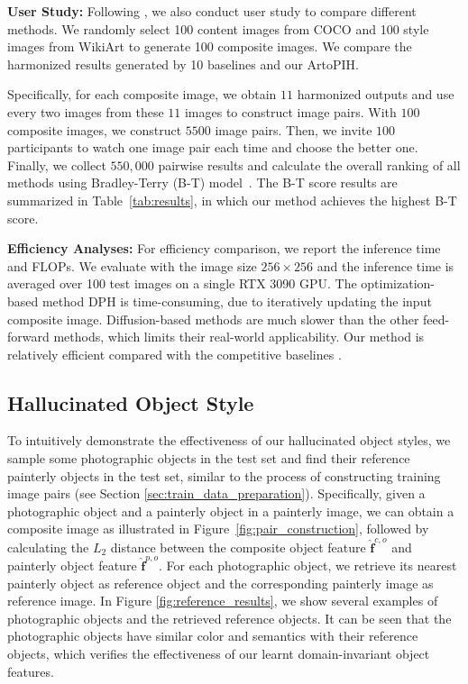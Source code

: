 \documentclass[letterpaper]{article} %
\begin{document}
\textbf{User Study:} Following \cite{cao2022painterly}, we also conduct user study to compare different methods. We randomly select 100 content images from COCO and 100 style images from WikiArt to generate 100 composite images. We compare the harmonized results generated by 10 baselines and our ArtoPIH.

Specifically, for each composite image, we obtain $11$ harmonized outputs and use every two images from these $11$ images to construct image pairs. With $100$ composite images, we construct $5500$ image pairs. Then, we invite $100$ participants to watch one image pair each time and choose the better one. Finally, we collect $550,000$ pairwise results and calculate the overall ranking of all methods using Bradley-Terry (B-T) model~\cite{bradley1952rank,lai2016comparative}. The B-T score results are summarized in Table~\ref{tab:results}, in which our method achieves the highest B-T score.


\textbf{Efficiency Analyses:} For efficiency comparison, we report the inference time and FLOPs. We evaluate with the image size $256 \times 256$ and the inference time is averaged over 100 test images on a single RTX 3090 GPU.
The optimization-based method DPH is time-consuming, due to iteratively updating the input composite image. Diffusion-based methods are much slower than the other feed-forward methods, which limits their real-world applicability.
Our method is relatively efficient compared with the competitive baselines \cite{cao2022painterly,luan2018deep}.









\subsection{Hallucinated Object Style}
To intuitively demonstrate the effectiveness of our hallucinated object styles, we sample some photographic objects in the test set and find their reference painterly objects in the test set, similar to the process of constructing training image pairs (see Section \ref{sec:train_data_preparation}). Specifically, given a photographic object and a painterly object in a painterly image, we can obtain a composite image as illustrated in Figure~\ref{fig:pair_construction}, followed by calculating the $L_2$ distance between the composite object feature $\hat{\bm{f}}^{c,o}$ and painterly object feature $\hat{\bm{f}}^{p,o}$. For each photographic object, we retrieve its nearest painterly object as reference object and the corresponding painterly image as reference image. In Figure \ref{fig:reference_results}, we show several examples of photographic objects and the retrieved reference objects. It can be seen that the photographic objects have similar color and semantics with their reference objects, which verifies the effectiveness of our learnt domain-invariant object features. %
\end{document}
